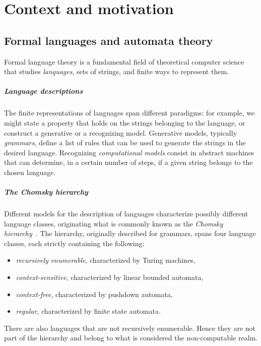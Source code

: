 \chapter{Context and motivation}\label{ch:context}



\section{Formal languages and automata theory}
Formal language theory is a fundamental field of theoretical computer science that studies \emph{languages}, \ie sets of strings, and finite ways to represent them.

\paragraph{Language descriptions} The finite representations of languages span different paradigms: for example, we might state a property that holds on the strings belonging to the language, or construct a generative or a recognizing model.
Generative models, typically \emph{grammars}, define a list of rules that can be used to generate the strings in the desired language.
Recognizing \emph{computational models} consist in abstract machines that can determine, in a certain number of steps, if a given string belongs to the chosen language.

\paragraph{The Chomsky hierarchy} Different models for the description of languages characterize possibly different language classes, originating what is commonly known as the \emph{Chomsky hierarchy}~\cite{Cho56}.
The hierarchy, originally described for grammars, spans four language classes, each strictly containing the following:
\begin{itemize}
	\item \emph{recursively enumerable}, characterized by Turing machines,
	\item \emph{context-sensitive}, characterized by linear bounded automata,
	\item \emph{context-free}, characterized by pushdown automata,
	\item \emph{regular}, characterized by finite state automata.
\end{itemize}
There are also languages that are not recursively enumerable. Hence they are not part of the hierarchy and belong to what is considered the non-computable realm.

